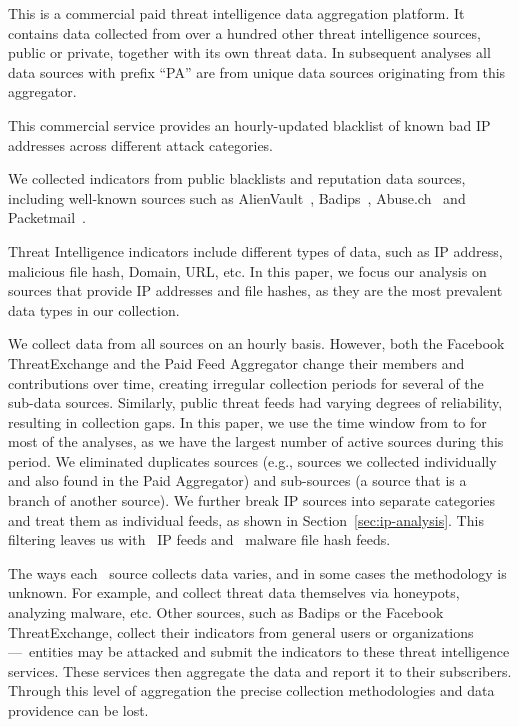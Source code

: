  This is a commercial paid threat intelligence data aggregation
    platform. It contains data collected from over a hundred other
    threat intelligence sources, public or private, together with its own threat data.
    In subsequent analyses all data sources with prefix ``PA''
    are from unique data sources originating from this aggregator.

 This commercial service provides an
    hourly-updated blacklist of known bad IP addresses across different attack categories.

 We collected indicators from public
    blacklists and reputation data sources, including well-known
    sources such as AlienVault~\cite{Alienvault}, Badips~\cite{Badips}, Abuse.ch~\cite{Abuse-ch}
    and Packetmail~\cite{Packetmail}.

Threat Intelligence indicators include different types of data, such as IP address, malicious file hash, Domain,
URL, etc. In this paper, we focus our analysis on sources that provide IP addresses and file hashes,
as they are the most prevalent data types in our collection.

We collect data from all sources on an hourly basis. However, both the Facebook
ThreatExchange and the Paid Feed Aggregator change their members and contributions
over time, creating irregular collection periods for several of the sub-data sources.
Similarly, public threat feeds had varying degrees of reliability, resulting in
collection gaps. In this paper, we use the time window from 
to  for most of the analyses, as we have the largest number
of active sources during this period. We eliminated duplicates sources (e.g., sources
we collected individually and also found in the {Paid Aggregator}) and
sub-sources (a source that is a branch of another source). We further break IP
sources into separate categories and treat them as individual feeds, as shown in
Section~\ref{sec:ip-analysis}. This filtering leaves us with \numipfeeds\ IP feeds and
\numhashfeeds\ malware file hash feeds.

The ways each \ti\ source collects data varies, and in some cases
the methodology is unknown. For example, {\feedpacketmail} and {\feedetiprep}
collect threat data themselves via honeypots, analyzing malware, etc. Other
sources, such as {Badips} or the Facebook ThreatExchange, collect their
indicators from general users or organizations---\eg\ entities may be attacked
and submit the indicators to these threat intelligence services. These services
then aggregate the data and report it to their subscribers. Through this level of
aggregation the precise collection methodologies and data
providence can be lost.




